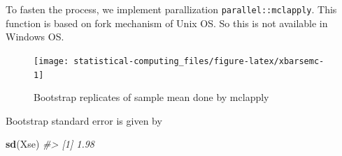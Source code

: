 \documentclass[]{book}
\newenvironment{Shaded}{\begin{snugshade}}{\end{snugshade}}
\newcommand{\CommentTok}[1]{\textcolor[rgb]{0.56,0.35,0.01}{\textit{#1}}}
\newcommand{\ControlFlowTok}[1]{\textcolor[rgb]{0.13,0.29,0.53}{\textbf{#1}}}
\newcommand{\DataTypeTok}[1]{\textcolor[rgb]{0.13,0.29,0.53}{#1}}
\newcommand{\DecValTok}[1]{\textcolor[rgb]{0.00,0.00,0.81}{#1}}
\newcommand{\KeywordTok}[1]{\textcolor[rgb]{0.13,0.29,0.53}{\textbf{#1}}}
\newcommand{\NormalTok}[1]{#1}
\newcommand{\OperatorTok}[1]{\textcolor[rgb]{0.81,0.36,0.00}{\textbf{#1}}}
\newcommand{\StringTok}[1]{\textcolor[rgb]{0.31,0.60,0.02}{#1}}
\theoremstyle{definition}
\theoremstyle{definition}
\theoremstyle{definition}
\theoremstyle{remark}
\begin{document}
To fasten the process, we implement parallization \texttt{parallel::mclapply}. This function is based on fork mechanism of Unix OS. So this is not available in Windows OS.

\begin{Shaded}
\end{Shaded}

\begin{Shaded}
\end{Shaded}

\begin{figure}[H]

{\centering \texttt{[image: statistical-computing\_files/figure-latex/xbarsemc-1]} 

}

\caption{Bootstrap replicates of sample mean done by mclapply}\label{fig:xbarsemc}
\end{figure}

Bootstrap standard error is given by

\begin{Shaded}
\begin{Highlighting}[]
\KeywordTok{sd}\NormalTok{(Xse)}
\CommentTok{#> [1] 1.98}
\end{Highlighting}
\end{Shaded}
\end{document}
